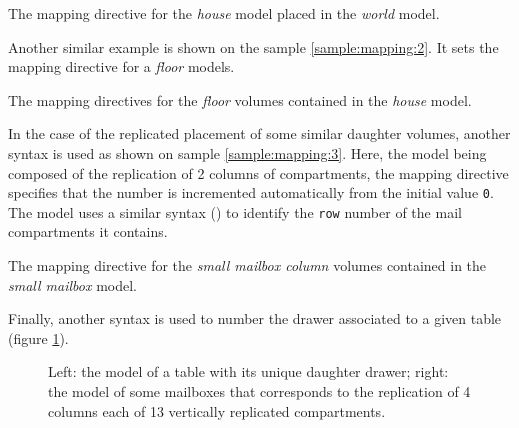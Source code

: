\begin{sample}
\caption{The mapping directive  for the \emph{house} model placed in
  the \emph{world} model.}
\label{sample:mapping:1}
\end{sample}

 Another    similar     example    is    shown     on    the    sample
 \ref{sample:mapping:2}.   It  sets  the   mapping  directive   for  a
 \emph{floor} models.

 \begin{sample}
   \caption{The mapping directives  for the \emph{floor} volumes 
     contained in the  \emph{house} model.}
   \label{sample:mapping:2}
 \end{sample}

In  the case  of the  replicated  placement of  some similar  daughter
volumes,    another   syntax    is   used    as   shown    on   sample
\ref{sample:mapping:3}.  Here,  the    model  being
composed of the replication of  2 columns of compartments, the mapping
directive    specifies  that  the   number  is
incremented  automatically  from  the  initial value  \texttt{0}.  The
 model  uses a similar  syntax ()
to  identify  the \texttt{row}  number  of  the  mail compartments  it
contains.

\begin{sample}
  \caption{The mapping directive  for the \emph{small mailbox column} volumes 
    contained in the  \emph{small mailbox} model.}
  \label{sample:mapping:3}
\end{sample}

Finally, another syntax  is used to number the  drawer associated to a
given  table (figure \ref{fig:mapping:3}). 

\begin{figure}[h]
  \begin{center}
  \end{center}
  \caption{Left: the model of a table with its unique daughter drawer;
    right:  the  model  of  some  mailboxes that  corresponds  to  the
    replication  of  4  columns   each  of  13  vertically  replicated
    compartments.}\label{fig:mapping:3}
\end{figure}


